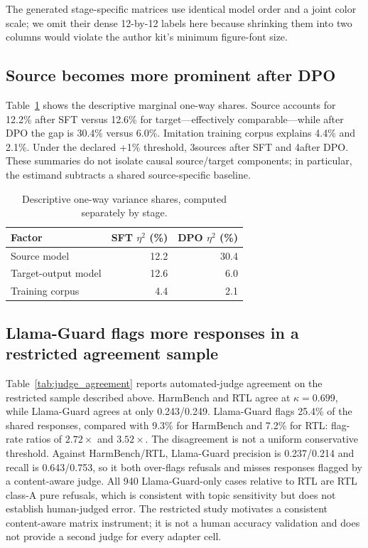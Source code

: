 \documentclass[letterpaper]{article}
\newcommand{\SFTSourceEtaPct}{12.2}
\newcommand{\SFTTargetEtaPct}{12.6}
\newcommand{\SFTDatasetEtaPct}{4.4}
\newcommand{\DPOSourceEtaPct}{30.4}
\newcommand{\DPOTargetEtaPct}{6.0}
\newcommand{\DPODatasetEtaPct}{2.1}
\newcommand{\SFTEroderSources}{3}
\newcommand{\DPOEroderSources}{4}
\begin{document}
The generated stage-specific matrices use identical model order and a joint color scale;
we omit their dense 12-by-12 labels here because shrinking them into two columns would
violate the author kit's minimum figure-font size.

\subsection{Source becomes more prominent after DPO}

Table~\ref{tab:variance} shows the descriptive marginal one-way shares. Source accounts
for \SFTSourceEtaPct\% after SFT versus \SFTTargetEtaPct\% for target---effectively
comparable---while after DPO the gap is \DPOSourceEtaPct\% versus
\DPOTargetEtaPct\%. Imitation training corpus explains
\SFTDatasetEtaPct\% and \DPODatasetEtaPct\%. Under the declared +1\% threshold,
\SFTEroderSources sources after SFT and \DPOEroderSources after DPO. These summaries do
not isolate causal source/target components; in particular, the estimand subtracts a
shared source-specific baseline.

\begin{table}[t]
\centering
\begin{tabular}{lrr}
\toprule
Factor & SFT $\eta^2$ (\%) & DPO $\eta^2$ (\%) \\
\midrule
Source model & \SFTSourceEtaPct & \DPOSourceEtaPct \\
Target-output model & \SFTTargetEtaPct & \DPOTargetEtaPct \\
Training corpus & \SFTDatasetEtaPct & \DPODatasetEtaPct \\
\bottomrule
\end{tabular}
\caption{Descriptive one-way variance shares, computed separately by stage.}
\label{tab:variance}
\end{table}

\subsection{Llama-Guard flags more responses in a restricted agreement sample}

Table~\ref{tab:judge_agreement} reports automated-judge agreement on the restricted
sample described above.
HarmBench and RTL agree at $\kappa=0.699$, while Llama-Guard agrees at only 0.243/0.249.
Llama-Guard flags 25.4\% of the shared responses, compared with 9.3\% for HarmBench and
7.2\% for RTL: flag-rate ratios of $2.72\times$ and $3.52\times$. The disagreement is
not a uniform conservative threshold. Against HarmBench/RTL, Llama-Guard precision is
0.237/0.214 and recall is 0.643/0.753, so it both over-flags refusals and misses responses
flagged by a content-aware judge. All 940 Llama-Guard-only cases relative to RTL are
RTL class-A pure refusals, which is consistent with topic sensitivity but does not
establish human-judged error. The restricted study motivates a consistent
content-aware matrix instrument; it is not a human accuracy validation and does not
provide a second judge for every adapter cell.
\end{document}
